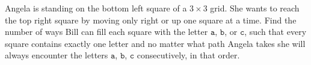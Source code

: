 Angela is standing on the bottom left square of a $3\times 3$ grid. She wants to reach the top right square by moving only right or up one square at a time. Find the number of ways Bill can fill each square with the letter $\mathtt{a}$, $\mathtt{b}$, or $\mathtt{c}$, such that every square contains exactly one letter and no matter what path Angela takes she will always encounter the letters $\mathtt{a}$, $\mathtt{b}$, $\mathtt{c}$ consecutively, in that order.
